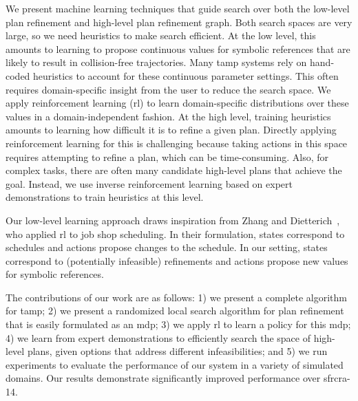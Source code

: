We present machine learning techniques that guide
search over both the low-level plan refinement and high-level plan refinement graph.
Both search spaces are very large, so we need heuristics to make search efficient.
At the low level, this amounts to
learning to propose continuous values for symbolic references that are likely to result in
collision-free trajectories. Many {\sc tamp} systems rely on hand-coded heuristics to
account for these continuous parameter settings. This often requires
domain-specific insight from the user to reduce the search space.
We apply reinforcement learning ({\sc rl}) to learn domain-specific distributions
over these values in a domain-independent fashion.
At the high level, training heuristics amounts to learning
how difficult it is to refine a given plan. Directly applying reinforcement learning
for this is challenging because taking actions in this space requires attempting to
refine a plan, which can be time-consuming. Also, for complex tasks, there are often many candidate high-level plans that
achieve the goal. Instead, we use inverse reinforcement learning
based on expert demonstrations to train heuristics at this level.

Our low-level learning approach draws inspiration
from Zhang and Dietterich~\cite{JobShopSched}, who applied {\sc rl} to job
shop scheduling. In their formulation, states correspond to schedules
and actions propose changes to the schedule. In our setting, states
correspond to (potentially infeasible) refinements and actions propose
new values for symbolic references.

The contributions of our work are as follows: 1)
we present a complete algorithm for {\sc tamp}; 2) we present a randomized
local search algorithm for plan refinement that is easily formulated
as an {\sc mdp}; 3) we apply {\sc rl} to learn
a policy for this {\sc mdp}; 4) we learn from expert demonstrations to
efficiently search the space of high-level plans,
given options that address different infeasibilities; and 5)
we run experiments to evaluate the performance of our system in a
variety of simulated domains. Our results demonstrate
significantly improved performance over {\sc sfrcra-14}.